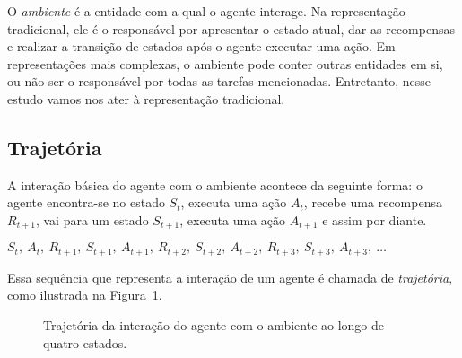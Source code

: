 \documentclass{article}
\begin{document}
                O \emph{ambiente} é a entidade com a qual o agente interage. Na representação tradicional, ele é o responsável por apresentar o estado atual, dar as recompensas e realizar a transição de estados após o agente executar uma ação. Em representações mais complexas, o ambiente pode conter outras entidades em si, ou não ser o responsável por todas as tarefas mencionadas. Entretanto, nesse estudo vamos nos ater à representação tradicional.
            
        \subsection{Trajetória}
        
            A interação básica do agente com o ambiente acontece da seguinte forma: o agente encontra-se no estado $S_t$, executa uma ação $A_t$, recebe uma recompensa $R_{t+1}$, vai para um estado $S_{t+1}$, executa uma ação $A_{t+1}$ e assim por diante.

            $S_t,\ A_t,\ R_{t+1},\ S_{t+1},\ A_{t+1},\ R_{t+2},\ S_{t+2},\ A_{t+2},\ R_{t+3},\ S_{t+3},\ A_{t+3},\ \dots$
            
            \noindent
            Essa sequência que representa a interação de um agente é chamada de \emph{trajetória}, como ilustrada na Figura~\ref{fig:trajectory}.

            \begin{figure}[ht]
                \centering
                \caption{Trajetória da interação do agente com o ambiente ao longo de quatro estados.}
                \label{fig:trajectory}
            \end{figure}
                
\end{document}
